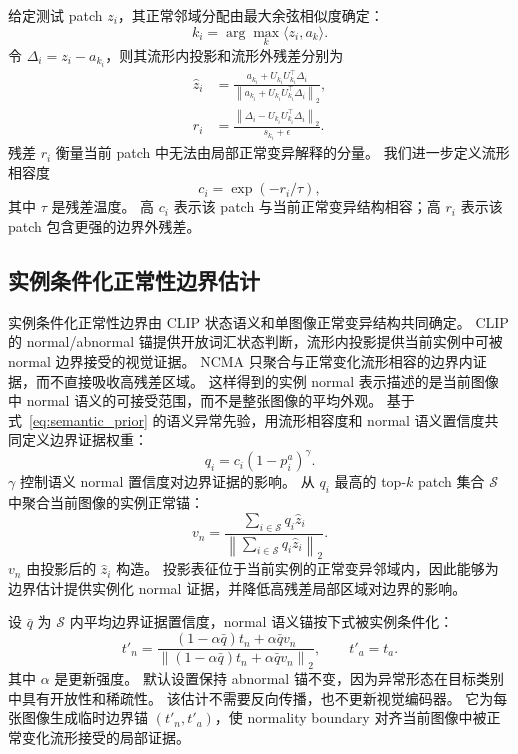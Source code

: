 \documentclass[UTF8,11pt,a4paper,fontset=none]{ctexart}
\newcommand{\method}{NCMA}
\newcommand{\clip}{CLIP}
\newcommand{\norm}[1]{\left\lVert #1 \right\rVert}
\begin{document}
给定测试 patch \(z_i\)，其正常邻域分配由最大余弦相似度确定：
\begin{equation}
  k_i=\arg\max_{k} \langle z_i,a_k\rangle .
  \label{eq:assignment}
\end{equation}
令 \(\Delta_i=z_i-a_{k_i}\)，则其流形内投影和流形外残差分别为
\begin{align}
  \hat z_i
  &=
  \frac{a_{k_i}+U_{k_i}U_{k_i}^{\top}\Delta_i}
       {\norm{a_{k_i}+U_{k_i}U_{k_i}^{\top}\Delta_i}_2}, \label{eq:projection}\\
  r_i
  &=
  \frac{\norm{\Delta_i-U_{k_i}U_{k_i}^{\top}\Delta_i}_2}
       {s_{k_i}+\epsilon}. \label{eq:residual}
\end{align}
残差 \(r_i\) 衡量当前 patch 中无法由局部正常变异解释的分量。
我们进一步定义流形相容度
\begin{equation}
  c_i=\exp(-r_i/\tau),
  \label{eq:compatibility}
\end{equation}
其中 \(\tau\) 是残差温度。
高 \(c_i\) 表示该 patch 与当前正常变异结构相容；高 \(r_i\) 表示该 patch 包含更强的边界外残差。

\subsection{实例条件化正常性边界估计}
\label{sec:anchor_calibration}

实例条件化正常性边界由 CLIP 状态语义和单图像正常变异结构共同确定。
\clip{} 的 normal/abnormal 锚提供开放词汇状态判断，流形内投影提供当前实例中可被 normal 边界接受的视觉证据。
\method{} 只聚合与正常变化流形相容的边界内证据，而不直接吸收高残差区域。
这样得到的实例 normal 表示描述的是当前图像中 normal 语义的可接受范围，而不是整张图像的平均外观。
基于式~\eqref{eq:semantic_prior} 的语义异常先验，用流形相容度和 normal 语义置信度共同定义边界证据权重：
\begin{equation}
  q_i=c_i(1-p_i^a)^\gamma .
  \label{eq:normal_weight}
\end{equation}
\(\gamma\) 控制语义 normal 置信度对边界证据的影响。
从 \(q_i\) 最高的 top-\(k\) patch 集合 \(\mathcal{S}\) 中聚合当前图像的实例正常锚：
\begin{equation}
  v_n=
  \frac{\sum_{i\in \mathcal{S}} q_i \hat z_i}
       {\norm{\sum_{i\in \mathcal{S}} q_i \hat z_i}_2}.
  \label{eq:visual_normal_anchor}
\end{equation}
\(v_n\) 由投影后的 \(\hat z_i\) 构造。
投影表征位于当前实例的正常变异邻域内，因此能够为边界估计提供实例化 normal 证据，并降低高残差局部区域对边界的影响。

设 \(\bar q\) 为 \(\mathcal{S}\) 内平均边界证据置信度，normal 语义锚按下式被实例条件化：
\begin{equation}
  t'_n=
  \frac{(1-\alpha \bar q)t_n+\alpha \bar q v_n}
       {\norm{(1-\alpha \bar q)t_n+\alpha \bar q v_n}_2},
  \qquad
  t'_a=t_a .
  \label{eq:text_anchor_update}
\end{equation}
其中 \(\alpha\) 是更新强度。
默认设置保持 abnormal 锚不变，因为异常形态在目标类别中具有开放性和稀疏性。
该估计不需要反向传播，也不更新视觉编码器。
它为每张图像生成临时边界锚 \((t'_n,t'_a)\)，使 normality boundary 对齐当前图像中被正常变化流形接受的局部证据。
\end{document}
